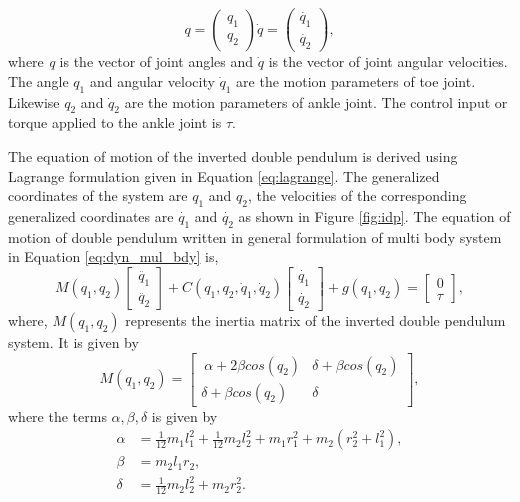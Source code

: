 \begin{equation}
	 q = 
	\begin{pmatrix}
		q_{1}\\
		q_{2}
	\end{pmatrix}
	 \dot{q} = 
	\begin{pmatrix}
		\dot{q_{1}}\\
		\dot{q_{2}}
	\end{pmatrix},
\end{equation}
where \emph{q} is the vector of joint angles and $\dot{q}$ is the vector of joint angular velocities. The angle $q_1$ and angular velocity $\dot{q}_1$ are the motion parameters of toe joint. Likewise $q_2$ and $\dot{q}_2$ are the motion parameters of ankle joint. The control input or torque applied to the ankle joint is $\tau$. 

The equation of motion of the inverted double pendulum is derived using Lagrange formulation given in Equation \ref{eq:lagrange}. The generalized coordinates of the system are $q_1$ and $q_2$, the velocities of the corresponding generalized coordinates are $\dot{q_1}$ and $\dot{q_2}$ as shown in Figure \ref{fig:idp}. The equation of motion of double pendulum written in general formulation of multi body system in Equation \ref{eq:dyn_mul_bdy} is, 
\begin{equation}
   \label{eq:dyn_idp}
	M(q_1,q_2)
	\begin{bmatrix}
		\ddot{q_{1}} \\
		\ddot{q_{2}} 
	\end{bmatrix}
	+ C(q_1,q_2,\dot{q}_1,\dot{q}_2)
    \begin{bmatrix}
		\dot{q_{1}} \\
		\dot{q_{2}} 
	\end{bmatrix}
	+ g(q_1,q_2) = 
    \begin{bmatrix} 0 \\ \tau \end{bmatrix},
\end{equation}
where, $M(q_1,q_2)$ represents the inertia matrix of the inverted double pendulum system. It is given by 
$$ M(q_1,q_2) = \begin{bmatrix}\
    \alpha+2\beta cos(q_2) & \delta + \beta cos(q_2) \\ 
    \delta + \beta cos(q_2) & \delta  \end{bmatrix},$$ where the terms $\alpha, \beta, \delta$ is given by
    $$
    \begin{aligned}
    \alpha &= \frac{1}{12} m_1 l_1^2 + \frac{1}{12} m_2 l_2^2 + m_1 r_1^2 + m_2 (r_2^2 + l_1^2),\\
    \beta &= m_2 l_1 r_2, \\
    \delta &= \frac{1}{12} m_2 l_2^2 + m_2 r_2^2.
    \end{aligned}
    $$
